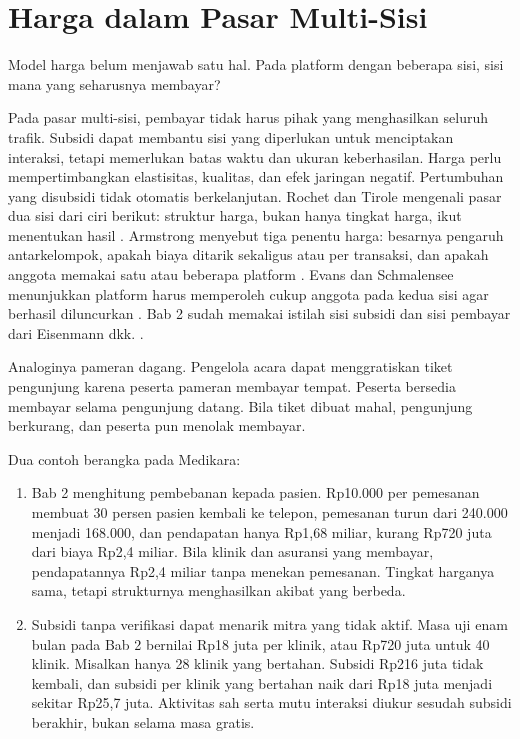 \section{Harga dalam Pasar Multi-Sisi}

Model harga belum menjawab satu hal. Pada platform dengan beberapa sisi, sisi mana yang seharusnya membayar?

Pada pasar multi-sisi, pembayar tidak harus pihak yang menghasilkan seluruh trafik. Subsidi dapat membantu sisi yang diperlukan untuk
menciptakan interaksi, tetapi memerlukan batas waktu dan ukuran keberhasilan. Harga perlu mempertimbangkan elastisitas, kualitas, dan
efek jaringan negatif. Pertumbuhan yang disubsidi tidak otomatis berkelanjutan. Rochet dan Tirole mengenali pasar dua sisi dari ciri
berikut: struktur harga, bukan hanya tingkat harga, ikut menentukan hasil \cite{c12-rochet2006}. Armstrong menyebut tiga penentu
harga: besarnya pengaruh antarkelompok, apakah biaya ditarik sekaligus atau per transaksi, dan apakah anggota memakai satu atau
beberapa platform \cite{armstrong2006competition}. Evans dan Schmalensee menunjukkan platform harus memperoleh cukup anggota pada kedua sisi
agar berhasil diluncurkan \cite{c12-evans2010}. Bab 2 sudah memakai istilah sisi subsidi dan sisi pembayar dari Eisenmann dkk.
\cite{eisenmann2006strategies}.

Analoginya pameran dagang. Pengelola acara dapat menggratiskan tiket pengunjung karena peserta pameran membayar tempat. Peserta
bersedia membayar selama pengunjung datang. Bila tiket dibuat mahal, pengunjung berkurang, dan peserta pun menolak membayar.

Dua contoh berangka pada Medikara:
\begin{enumerate}
  \item Bab 2 menghitung pembebanan kepada pasien. Rp10.000 per pemesanan membuat 30 persen pasien kembali ke telepon, pemesanan turun
        dari 240.000 menjadi 168.000, dan pendapatan hanya Rp1,68 miliar, kurang Rp720 juta dari biaya Rp2,4 miliar. Bila klinik
        dan asuransi yang membayar, pendapatannya Rp2,4 miliar tanpa menekan pemesanan. Tingkat harganya sama, tetapi strukturnya
        menghasilkan akibat yang berbeda.
  \item Subsidi tanpa verifikasi dapat menarik mitra yang tidak aktif. Masa uji enam bulan pada Bab 2 bernilai Rp18 juta per klinik,
        atau Rp720 juta untuk 40 klinik. Misalkan hanya 28 klinik yang bertahan. Subsidi Rp216 juta tidak kembali, dan subsidi per
        klinik yang bertahan naik dari Rp18 juta menjadi sekitar Rp25,7 juta. Aktivitas sah serta mutu interaksi diukur sesudah subsidi
        berakhir, bukan selama masa gratis.
\end{enumerate}

